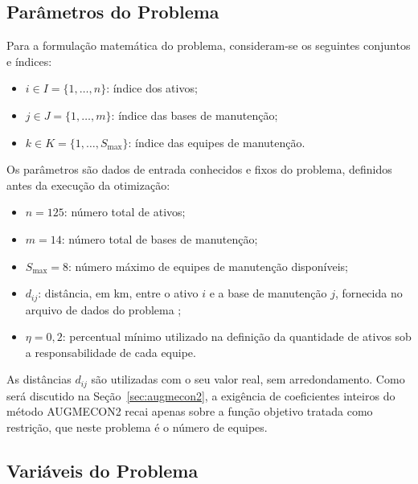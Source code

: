 \documentclass[conference]{IEEEtran}
\begin{document}
\subsection{Parâmetros do Problema}

Para a formulação matemática do problema, consideram-se os seguintes conjuntos e índices:
\begin{itemize}
  \item $i \in I = \{1,\dots,n\}$: índice dos ativos;
  \item $j \in J = \{1,\dots,m\}$: índice das bases de manutenção;
  \item $k \in K = \{1,\dots,S_{\max}\}$: índice das equipes de manutenção.
\end{itemize}

Os parâmetros são dados de entrada conhecidos e fixos do problema, definidos antes da execução da otimização:
\begin{itemize}
  \item $n = 125$: número total de ativos;
  \item $m = 14$: número total de bases de manutenção;
  \item $S_{\max} = 8$: número máximo de equipes de manutenção disponíveis;
  \item $d_{ij}$: distância, em km, entre o ativo $i$ e a base de manutenção $j$, fornecida no arquivo de dados do problema \cite{batista_tc};
  \item $\eta = 0{,}2$: percentual mínimo utilizado na definição da quantidade de ativos sob a responsabilidade de cada equipe.
\end{itemize}

As distâncias $d_{ij}$ são utilizadas com o seu valor real, sem arredondamento. Como será discutido na Seção~\ref{sec:augmecon2}, a exigência de coeficientes inteiros do método AUGMECON2 recai apenas sobre a função objetivo tratada como restrição, que neste problema é o número de equipes.

\subsection{Variáveis do Problema}
\end{document}
